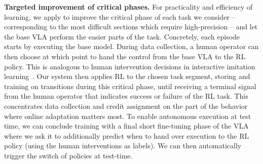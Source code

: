 \textbf{Targeted improvement of critical phases.}
For practicality and efficiency of learning, we apply \MethodName{} to improve the critical phase of each task we consider -- corresponding to the most difficult sections which require high-precision -- and let the base VLA perform the easier parts of the task.
Concretely, each episode starts by executing the base model. During data collection, a human operator can then choose at which point to hand the control from the base VLA to the RL policy. This is analogous to human intervention decisions in interactive imitation learning~\citep{kelly2019hgdaggerinteractiveimitationlearning}. Our system then applies RL to the chosen task segment, storing and training on transitions during this critical phase, until receiving a terminal signal from the human operator that indicates success or failure of the RL task. This concentrates data collection and credit assignment on the part of the behavior where online adaptation matters most. 
To enable autonomous execution at test time, we can conclude training with a final short fine-tuning phase of the VLA where we ask it to additionally predict when to hand over execution to the RL policy (using the human interventions as labels). We can then automatically trigger the switch of policies at test-time.

